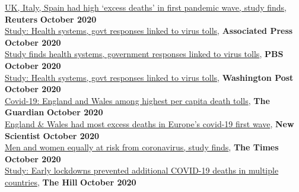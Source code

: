 \href{https://uk.reuters.com/article/uk-health-coronavirus-deaths-excess/uk-italy-spain-had-high-excess-deaths-in-first-pandemic-wave-study-finds-idUKKBN26Z151}{UK, Italy, Spain had high ‘excess deaths’ in first pandemic wave, study finds}, \textbf{Reuters} \hfill \textbf{October 2020}\\
\href{https://apnews.com/article/virus-outbreak-pandemics-public-health-disease-outbreaks-europe-acf6b710cab51381a05a4e1b5fc9c931}{Study: Health systems, govt responses linked to virus tolls}, \textbf{Associated Press} \hfill \textbf{October 2020}\\
\href{https://www.pbs.org/newshour/health/study-finds-health-systems-government-responses-linked-to-virus-tolls}{Study finds health systems, government responses linked to virus tolls}, \textbf{PBS} \hfill \textbf{October 2020}\\
\href{https://www.washingtonpost.com/world/europe/study-health-systems-govt-responses-linked-to-virus-tolls/2020/10/14/4c3b2d46-0e19-11eb-b404-8d1e675ec701_story.html}{Study: Health systems, govt responses linked to virus tolls}, \textbf{Washington Post} \hfill \textbf{October 2020}\\
\href{https://www.theguardian.com/world/2020/oct/14/covid-19-england-and-wales-among-highest-per-capita-death-tolls?utm_term=Autofeed&CMP=twt_gu&utm_medium&utm_source=Twitter#Echobox=1602667525}{Covid-19: England and Wales among highest per capita death tolls}, \textbf{The Guardian} \hfill \textbf{October 2020}\\
\href{https://www.newscientist.com/article/2256986-england-wales-had-most-excess-deaths-in-europes-covid-19-first-wave/}{England \& Wales had most excess deaths in Europe’s covid-19 first wave}, \textbf{New Scientist} \hfill \textbf{October 2020}\\
\href{https://www.thetimes.co.uk/edition/news/men-and-women-equally-at-risk-from-pandemic-study-finds-28rnppfjj?utm_medium=Social&utm_source=Twitter#Echobox=1602673857}{Men and women equally at risk from coronavirus, study finds}, \textbf{The Times} \hfill \textbf{October 2020}\\
\href{https://thehill.com/policy/healthcare/legal-challenges/520992-study-early-lockdowns-prevented-additional-covid-19-deaths}{Study: Early lockdowns prevented additional COVID-19 deaths in multiple countries}, \textbf{The Hill} \hfill \textbf{October 2020}\\
